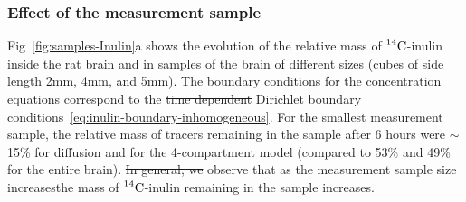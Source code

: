 \documentclass[a4paper,11pt]{article} %
\newcommand{\VV}[1]{\textcolor{red}{VV: #1}}
\newcommand{\1}{^{(1)}}
\newcommand{\2}{^{(2)}}
\newcommand{\Cinulin}{$\prescript{14}{}{\text{C}}$-inulin }
\newcommand{\commentout}[1]{}
\providecommand{\DIFaddtex}[1]{{\protect\color{blue}\uwave{#1}}} %
\providecommand{\DIFdeltex}[1]{{\protect\color{red}\sout{#1}}}                      %
\providecommand{\DIFaddbegin}{} %
\providecommand{\DIFaddend}{} %
\providecommand{\DIFdelbegin}{} %
\providecommand{\DIFdelend}{} %
\providecommand{\DIFadd}[1]{\texorpdfstring{\DIFaddtex{#1}}{#1}} %
\providecommand{\DIFdel}[1]{\texorpdfstring{\DIFdeltex{#1}}{}} %
\newcommand{\DIFscaledelfig}{0.5}
\newlength{\DIFdelgraphicswidth} %
\newlength{\DIFdelgraphicsheight} %
\newcommand{\DIFaddincludegraphics}[2][]{{\color{blue}\fbox{\DIFOincludegraphics[#1]{#2}}}} %
\newcommand{\DIFdelincludegraphics}[2][]{%
\sbox{\DIFdelgraphicsbox}{\DIFOincludegraphics[#1]{#2}}%
\settoboxwidth{\DIFdelgraphicswidth}{\DIFdelgraphicsbox} %
\settoboxtotalheight{\DIFdelgraphicsheight}{\DIFdelgraphicsbox} %
\scalebox{\DIFscaledelfig}{%
\parbox[b]{\DIFdelgraphicswidth}{\usebox{\DIFdelgraphicsbox}\\[-\baselineskip] \rule{\DIFdelgraphicswidth}{0em}}\llap{\resizebox{\DIFdelgraphicswidth}{\DIFdelgraphicsheight}{%
\setlength{\unitlength}{\DIFdelgraphicswidth}%
\begin{picture}(1,1)%
\thicklines\linethickness{2pt} %
{\color[rgb]{1,0,0}\put(0,0){\framebox(1,1){}}}%
{\color[rgb]{1,0,0}\put(0,0){\line( 1,1){1}}}%
{\color[rgb]{1,0,0}\put(0,1){\line(1,-1){1}}}%
\end{picture}%
}\hspace*{3pt}}} %
} %
\DeclareRobustCommand{\DIFaddbegin}{\DIFOaddbegin \let\includegraphics\DIFaddincludegraphics} %
\DeclareRobustCommand{\DIFaddend}{\DIFOaddend \let\includegraphics\DIFOincludegraphics} %
\DeclareRobustCommand{\DIFdelbegin}{\DIFOdelbegin \let\includegraphics\DIFdelincludegraphics} %
\DeclareRobustCommand{\DIFdelend}{\DIFOaddend \let\includegraphics\DIFOincludegraphics} %
\begin{document}
\DIFdelbegin %

\DIFdelend %
\subsubsection{Effect of the measurement sample} 
Fig~\ref{fig:samples-Inulin}a shows the evolution of the relative mass of \Cinulin inside the rat brain and in samples of the brain of different sizes (cubes of side length 2\si{mm}, 4\si{mm}, and 5\si{mm}). The boundary conditions for the concentration equations correspond to the \DIFdelbegin \DIFdel{time dependent }\DIFdelend \DIFaddbegin \DIFadd{time-dependent }\DIFaddend Dirichlet boundary conditions~\eqref{eq:inulin-boundary-inhomogeneous}. For the smallest measurement sample, the relative mass of tracers remaining in the sample after 6 hours were $\sim$15\% for diffusion and for the 4-compartment model (compared to 53\% and \DIFdelbegin \DIFdel{49}\DIFdelend \DIFaddbegin \DIFadd{50}\DIFaddend \%
for the entire brain). \DIFdelbegin \DIFdel{In general, we }\DIFdelend \DIFaddbegin \DIFadd{We }\DIFaddend observe that as the measurement sample size increases\DIFaddbegin \DIFadd{, }\DIFaddend the mass of \Cinulin remaining in the sample increases.


\DIFdelbegin \DIFdel{\commentout{
 \begin{figure}[htbp]
     \centering
     \begin{subfigure}[t]{0.45\textwidth}
         \captionsetup{width=0.9\textwidth}
         \centering
         \caption{Single diffusion equation}
     \end{subfigure}
     \hfill
     \begin{subfigure}[t]{0.45\textwidth}
         \captionsetup{width=0.9\textwidth}
         \centering
         \caption{Multi-compartment model.}
         \label{fig:multi-compartment-samples-Inulin}
     \end{subfigure}
     \caption{Relative \Cinulin mass located within regions of varying size surrounding the injection point. \VV{Figures need axis labels}}
\end{figure}
}
}%
\end{document}
